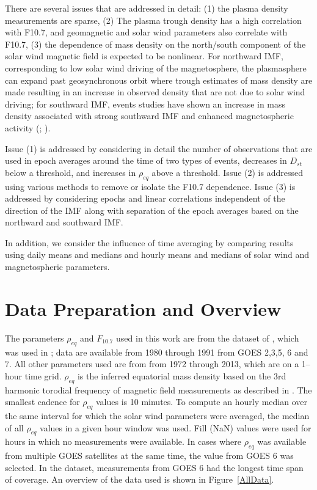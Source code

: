 \documentclass[10pt,twocolumn]{article}
\begin{document}
There are several issues that are addressed in detail: (1) the plasma density measurements are sparse, (2) The plasma trough density has a high correlation with F10.7, and geomagnetic and solar wind parameters also correlate with F10.7, (3) the dependence of mass density on the north/south component of the solar wind magnetic field is expected to be nonlinear. For northward IMF, corresponding to low solar wind driving of the magnetosphere, the plasmasphere can expand past geosynchronous orbit where trough estimates of mass density are made resulting in an increase in observed density that are not due to solar wind driving; for southward IMF, events studies have shown an increase in mass density associated with strong southward IMF and enhanced magnetospheric activity (\cite{Takahashi2010}; \cite{Yao2008}).

Issue (1) is addressed by considering in detail the number of observations that are used in epoch averages around the time of two types of events, decreases in $D_{st}$ below a threshold, and increases in $\rho_{eq}$ above a threshold.  Issue (2) is addressed using various methods to remove or isolate the F10.7 dependence.  Issue (3) is addressed by considering epochs and linear correlations independent of the direction of the IMF along with separation of the epoch averages based on the northward and southward IMF.

In addition, we consider the influence of time averaging by comparing results using daily means and medians and hourly means and medians of solar wind and magnetospheric parameters.

\section{Data Preparation and Overview}

The parameters $\rho_{eq}$ and $F_{10.7}$ used in this work are from the dataset of \cite{Denton}, which was used in \cite{Takahashi2010}; data are available from 1980 through 1991 from GOES 2,3,5, 6 and 7.  All other parameters used are from \cite{Kondrashov2014ReconstructionOfGaps} from 1972 through 2013, which are on a 1--hour time grid. $\rho_{eq}$ is the inferred equatorial mass density based on the 3rd harmonic torodial frequency of magnetic field measurements as described in \cite{Takahashi2010}.  The smallest cadence for $\rho_{eq}$ values is 10 minutes.  To compute an hourly median over the same interval for which the solar wind parameters were averaged, the median of all $\rho_{eq}$ values in a given hour window was used.  Fill (NaN) values were used for hours in which no measurements were available.  In cases where $\rho_{eq}$ was available from multiple GOES satellites at the same time, the value from GOES 6 was selected.  In the dataset, measurements from GOES 6 had the longest time span of coverage.  An overview of the data used is shown in Figure~\ref{AllData}.
\end{document}
